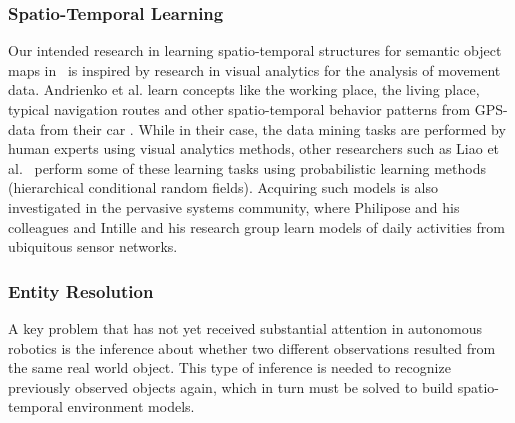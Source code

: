 \subsubsection{Spatio-Temporal Learning}
\label{sec:spatio-temporal-learning}

Our intended research in learning spatio-temporal structures for
semantic object maps in \ksem\ is inspired by research in visual analytics for the analysis
of movement data. Andrienko et al. learn concepts like the
working place, the living place, typical navigation routes and other
spatio-temporal behavior patterns from GPS-data from their car
\cite{Andrienko07}. While in their case, the data mining tasks are
performed by human experts using visual analytics methods, other
researchers such as Liao et al.\ \cite{Liao07a,Liao07b} perform some
of these learning tasks using probabilistic learning
methods (hierarchical conditional random fields).
Acquiring such models is also investigated in the pervasive
systems community, where Philipose and his colleagues
\cite{Pentney07,Landwehr07} and Intille and his research group
\cite{Intille06} learn models of daily activities from ubiquitous
sensor networks.



\subsubsection{Entity Resolution}
\label{sec:entity-resolution}

A key problem that has not yet received substantial attention in
autonomous robotics is the inference about whether two different
observations resulted from the same real world object. This type
of inference is needed to recognize previously observed objects again,
which in turn must be solved to build spatio-temporal environment models.

